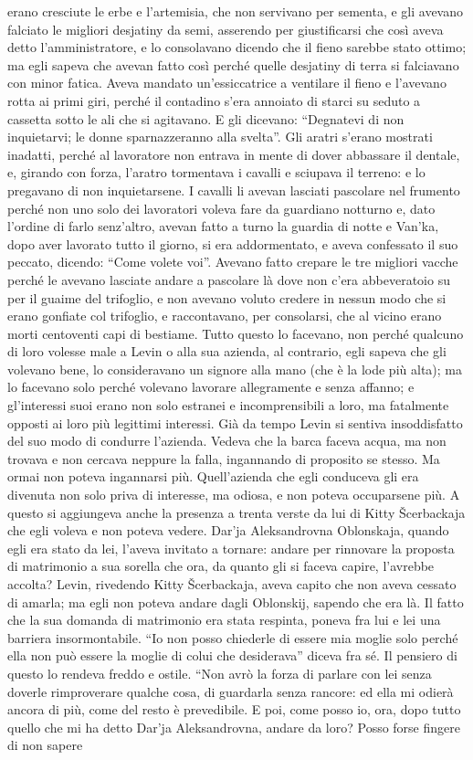 erano cresciute le erbe e l'artemisia, che non servivano per sementa, e gli avevano falciato le migliori desjatiny da semi, asserendo per giustificarsi che così aveva detto l'amministratore, e lo consolavano dicendo che il fieno sarebbe stato ottimo; ma egli sapeva che avevan fatto così perché quelle desjatiny di terra si falciavano con minor fatica. Aveva mandato un'essiccatrice a ventilare il fieno e l'avevano rotta ai primi giri, perché il contadino s'era annoiato di starci su seduto a cassetta sotto le ali che si agitavano. E gli dicevano: ``Degnatevi di non inquietarvi; le donne sparnazzeranno alla svelta''. Gli aratri s'erano mostrati inadatti, perché al lavoratore non entrava in mente di dover abbassare il dentale, e, girando con forza, l'aratro tormentava i cavalli e sciupava il terreno: e lo pregavano di non inquietarsene. I cavalli li avevan lasciati pascolare nel frumento perché non uno solo dei lavoratori voleva fare da guardiano notturno e, dato l'ordine di farlo senz'altro, avevan fatto a turno la guardia di notte e Van'ka, dopo aver lavorato tutto il giorno, si era addormentato, e aveva confessato il suo peccato, dicendo: ``Come volete voi''. Avevano fatto crepare le tre migliori vacche perché le avevano lasciate andare a pascolare là dove non c'era abbeveratoio su per il guaime del trifoglio, e non avevano voluto credere in nessun modo che si erano gonfiate col trifoglio, e raccontavano, per consolarsi, che al vicino erano morti centoventi capi di bestiame. Tutto questo lo facevano, non perché qualcuno di loro volesse male a Levin o alla sua azienda, al contrario, egli sapeva che gli volevano bene, lo consideravano un signore alla mano (che è la lode più alta); ma lo facevano solo perché volevano lavorare allegramente e senza affanno; e gl'interessi suoi erano non solo estranei e incomprensibili a loro, ma fatalmente opposti ai loro più legittimi interessi. Già da tempo Levin si sentiva insoddisfatto del suo modo di condurre l'azienda. Vedeva che la barca faceva acqua, ma non trovava e non cercava neppure la falla, ingannando di proposito se stesso. Ma ormai non poteva ingannarsi più. Quell'azienda che egli conduceva gli era divenuta non solo priva di interesse, ma odiosa, e non poteva occuparsene più. A questo si aggiungeva anche la presenza a trenta verste da lui di Kitty Šcerbackaja che egli voleva e non poteva vedere. Dar'ja Aleksandrovna Oblonskaja, quando egli era stato da lei, l'aveva invitato a tornare: andare per rinnovare la proposta di matrimonio a sua sorella che ora, da quanto gli si faceva capire, l'avrebbe accolta? Levin, rivedendo Kitty Šcerbackaja, aveva capito che non aveva cessato di amarla; ma egli non poteva andare dagli Oblonskij, sapendo che era là. Il fatto che la sua domanda di matrimonio era stata respinta, poneva fra lui e lei una barriera insormontabile. ``Io non posso chiederle di essere mia moglie solo perché ella non può essere la moglie di colui che desiderava'' diceva fra sé. Il pensiero di questo lo rendeva freddo e ostile. ``Non avrò la forza di parlare con lei senza doverle rimproverare qualche cosa, di guardarla senza rancore: ed ella mi odierà ancora di più, come del resto è prevedibile. E poi, come posso io, ora, dopo tutto quello che mi ha detto Dar'ja Aleksandrovna, andare da loro? Posso forse fingere di non sapere 